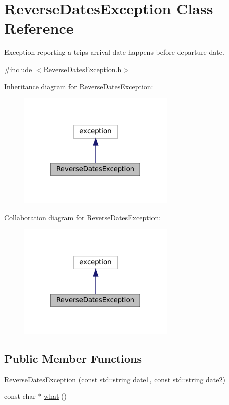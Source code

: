 \hypertarget{classReverseDatesException}{}\section{Reverse\+Dates\+Exception Class Reference}
\label{classReverseDatesException}


Exception reporting a trip\textquotesingle{}s arrival date happens before departure date.  




{\ttfamily \#include $<$Reverse\+Dates\+Exception.\+h$>$}



Inheritance diagram for Reverse\+Dates\+Exception\+:
\nopagebreak
\begin{figure}[H]
\begin{center}
\leavevmode
\includegraphics[width=213pt]{classReverseDatesException__inherit__graph}
\end{center}
\end{figure}


Collaboration diagram for Reverse\+Dates\+Exception\+:
\nopagebreak
\begin{figure}[H]
\begin{center}
\leavevmode
\includegraphics[width=213pt]{classReverseDatesException__coll__graph}
\end{center}
\end{figure}
\subsection*{Public Member Functions}
\begin{DoxyCompactItemize}
\item 
\mbox{\hyperlink{classReverseDatesException_afc245532384383f8f62b20358326c773}{Reverse\+Dates\+Exception}} (const std\+::string date1, const std\+::string date2)
\item 
const char $\ast$ \mbox{\hyperlink{classReverseDatesException_a52bb69fd0d940befffd9d69855ed6ae8}{what}} ()
\end{DoxyCompactItemize}


